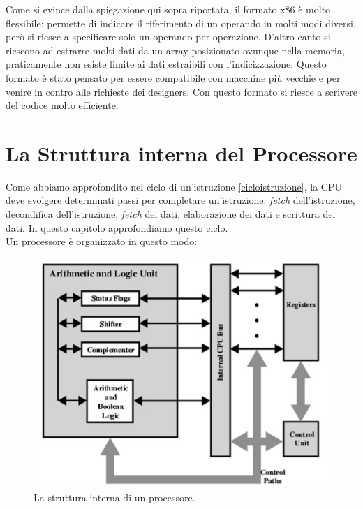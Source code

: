 \documentclass{article}
\begin{document}
Come si evince dalla spiegazione qui sopra riportata, il formato x86 è molto flessibile: permette di indicare il riferimento di un operando in molti modi diversi, però si riesce a specificare solo un operando per operazione. D'altro canto si riescono ad estrarre molti dati da un array posizionato ovunque nella memoria, praticamente non esiste limite ai dati estraibili con l'indicizzazione. Questo formato è stato pensato per essere compatibile con macchine più vecchie e per venire in contro alle richieste dei designers. Con questo formato si riesce a scrivere del codice molto efficiente.


\section{La Struttura interna del Processore}

Come abbiamo approfondito nel ciclo di un'istruzione \ref{cicloistruzione}, la CPU deve svolgere determinati passi per completare un'istruzione: \textit{fetch} dell'istruzione, decondifica dell'istruzione, \textit{fetch} dei dati, elaborazione dei dati e scrittura dei dati. In questo capitolo approfondiamo questo ciclo.\\
Un processore è organizzato in questo modo:

\begin{figure}[h]
	\label{processore}
	\centering
	\includegraphics[scale=0.3]{immagini/processore}
	\caption{La struttura interna di un processore.}
\end{figure}
\end{document}
